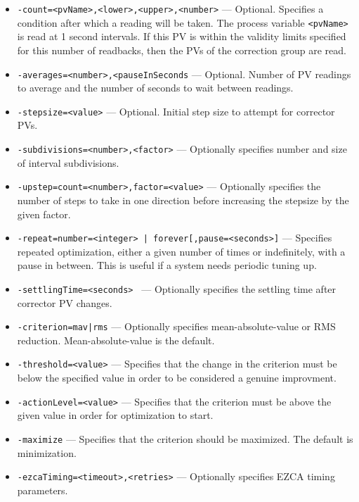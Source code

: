 \begin{itemize}
%
    \begin{itemize}
      \item {\tt -count=<pvName>,<lower>,<upper>,<number>} --- Optional. Specifies
                a condition after which a reading will be taken. The process variable
                \verb+<pvName>+ is read at 1 second intervals. If this
                PV is within the validity limits specified for this number of readbacks, then
                the PVs of the correction group are read.                
        \item {\tt -averages=<number>,<pauseInSeconds} --- Optional. Number of PV readings to average
                and the number of seconds to wait between readings.
        \item {\tt -stepsize=<value>} --- Optional. Initial step size to attempt for corrector PVs.
        \item {\tt -subdivisions=<number>,<factor>} --- Optionally specifies number and size of interval
                     subdivisions.
        \item {\tt -upstep=count=<number>,factor=<value>} --- Optionally specifies the number of steps
                to take in one direction before increasing the stepsize by the given factor.
        \item {\tt -repeat={number=<integer> | forever}[,pause=<seconds>]} --- Specifies repeated
                optimization, either a given number of times or indefinitely, with a pause in between.
                This is useful if a system needs periodic tuning up.
        \item {\tt -settlingTime=<seconds> } --- Optionally specifies the settling time after corrector PV changes.
        \item {\tt -criterion={mav|rms}} --- Optionally specifies mean-absolute-value or RMS reduction. 
                Mean-absolute-value is the default.
        \item {\tt -threshold=<value>} --- Specifies that the change in the criterion must be below the specified
        value in order to be considered a genuine improvment.
        \item {\tt -actionLevel=<value>} --- Specifies that the criterion must be above the given value
        in order for optimization to start.
        \item {\tt -maximize} --- Specifies that the criterion should be maximized.  The default is
                minimization.
        \item {\tt -ezcaTiming=<timeout>,<retries>} --- Optionally specifies EZCA timing parameters.

\end{itemize}
\end{itemize}
